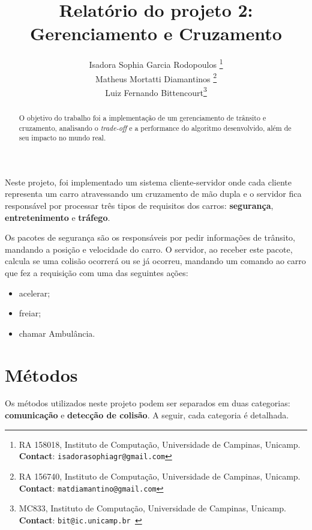 \documentclass[10pt,twocolumn,letterpaper]{article}
\begin{document}
\title{Relatório do projeto 2: Gerenciamento e Cruzamento}
\author{Isadora Sophia Garcia Rodopoulos \thanks{RA 158018, Instituto de Computação, Universidade de Campinas, Unicamp. \textbf{Contact}: \tt\small{isadorasophiagr@gmail.com}} \\
Matheus Mortatti Diamantinos \thanks{RA 156740, Instituto de Computação, Universidade de Campinas, Unicamp. \textbf{Contact}: \tt\small{matdiamantino@gmail.com}}\\
Luiz Fernando Bittencourt\thanks{MC833, Instituto de Computação, Universidade de Campinas, Unicamp. \textbf{Contact}: \tt\small{bit@ic.unicamp.br }}\\
}

\maketitle
\begin{abstract}
O objetivo do trabalho foi a implementação de um gerenciamento de trânsito e cruzamento, analisando o \textit{trade-off} e a performance do algoritmo desenvolvido, além de seu impacto no mundo real.
\end{abstract}

Neste projeto, foi implementado um sistema cliente-servidor onde cada cliente representa um carro atravessando um cruzamento de mão dupla e o servidor fica responsável por processar três tipos de requisitos dos carros: \textbf{segurança}, \textbf{entretenimento} e \textbf{tráfego}.

Os pacotes de segurança são os responsáveis por pedir informações de trânsito, mandando a posição e velocidade do carro. O servidor, ao receber este pacote, calcula se uma colisão ocorrerá ou se já ocorreu, mandando um comando ao carro que fez a requisição com uma das seguintes ações: 

\begin{itemize}
    \item acelerar; 
    \item freiar;
    \item chamar Ambulância.
\end{itemize}

\section{Métodos}
Os métodos utilizados neste projeto podem ser separados em duas categorias: \textbf{comunicação} e \textbf{detecção de colisão}. A seguir, cada categoria é detalhada.
\end{document}
